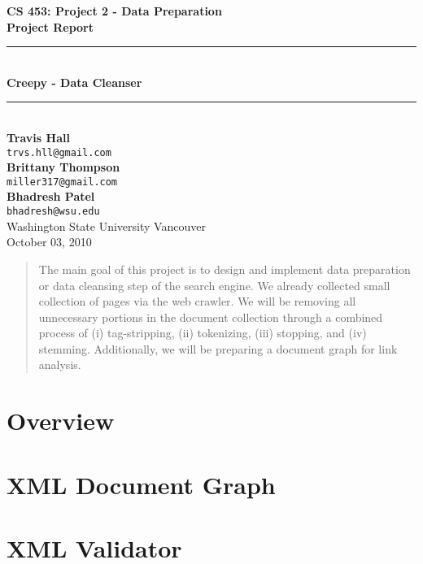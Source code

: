 \documentclass[letterpaper,11pt,twoside]{article}
\begin{document}
\begin{titlepage}
   \begin{center}
       {\Large \textbf{CS 453: Project 2 - Data Preparation}}\\[0.5cm]
       {\Large \textbf{Project Report}}\\[3.0cm]

       {\rule{\linewidth}{0.5mm}} \\[0.5cm]
       {\Huge \textbf{Creepy - Data Cleanser}}\\[0.4cm] 
       {\rule{\linewidth}{0.5mm}} \\[2.0cm]

       \textbf{Travis Hall}\\
       \texttt{trvs.hll@gmail.com}\\[0.5cm]
       \textbf{Brittany Thompson}\\
       \texttt{miller317@gmail.com}\\[0.5cm]
       \textbf{Bhadresh Patel}\\
       \texttt{bhadresh@wsu.edu}\\[0.5cm]

       \vfill
       Washington State University Vancouver\\
       October 03, 2010
   \end{center}
\end{titlepage}

\begin{abstract}
The main goal of this project is to design and implement data preparation or data cleansing step of the search engine. We already collected small collection of pages via the web crawler. We will be removing all unnecessary portions in the document collection through a
combined process of (i) tag-stripping, (ii) tokenizing, (iii) stopping, and (iv) stemming. Additionally, we
will be preparing a document graph for link analysis. 
\end{abstract}

\section{Overview}

\section{XML Document Graph}

\section{XML Validator}
\end{document}
